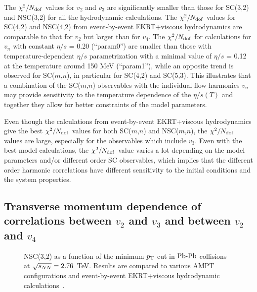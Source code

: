 The $\chi^2/N_{\rm dof}$ values for $v_2$ and $v_3$ are significantly smaller than those for SC(3,2) and NSC(3,2) for all the hydrodynamic calculations. The $\chi^2/N_{\rm dof}$ values for SC(4,2) and NSC(4,2) from event-by-event EKRT+viscous hydrodynamics are comparable to that for $v_2$ but larger than for $v_4$. The $\chi^2/N_{\rm dof}$ for calculations for $v_n$ with constant $\eta/s$ = 0.20 (``param0'') are smaller than those with temperature-dependent $\eta/s$ parametrization with a minimal value of $\eta/s$ = 0.12 at the temperature around 150 MeV (``param1''), while an opposite trend is observed for SC($m$,$n$), in particular for SC(4,2) and SC(5,3). 
This illustrates that a combination of the SC($m$,$n$) observables with the individual flow harmonics $v_n$ may provide sensitivity to the temperature dependence of the $\eta/s(T)$ and together they allow for better constraints of the model parameters.

Even though the calculations from event-by-event EKRT+viscous hydrodynamics give the best $\chi^2/N_{\rm dof}$ values for both SC($m$,$n$) and NSC($m$,$n$), the $\chi^2/N_{\rm dof}$
values are large, especially for the observables which include $v_3$. 
Even with the best model calculations, the $\chi^2/N_{\rm dof}$ value varies a lot depending on the model parameters and/or different order SC observables, which implies that the different order harmonic correlations have different sensitivity to the initial conditions and the system properties.

\subsection{Transverse momentum dependence of correlations between $v_2$ and $v_3$ and between $v_2$ and $v_4$}
\label{sec:ptdepsc}
\begin{figure}[t!]
             \begin{center}
              \end{center}
             \caption{NSC(3,2) as a function of the minimum $p_{\rm T}$ cut in $\textnormal{Pb-Pb}$ collisions at $\sqrt{s_{NN}}=2.76$~TeV. Results are compared to various AMPT configurations and event-by-event EKRT+viscous hydrodynamic calculations~\cite{Niemi:2015qia}.}
             \label{fig:Figure_8}
\end{figure}

